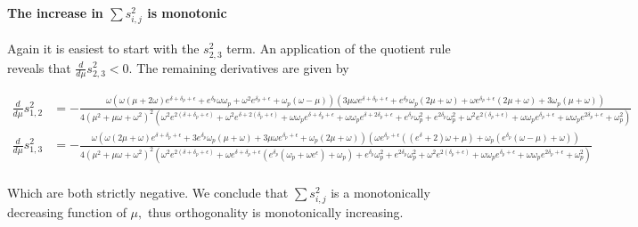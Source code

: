 \paragraph{The increase in $\sum{s^2_{i,j}}$ is monotonic}
Again it is easiest to start with the $s^2_{2,3}$ term.  An application of the quotient rule reveals that $\frac{d}{d\mu}s^2_{2,3}<0.$  
The remaining derivatives are given by
\begin{widetext}
\begin{eqnarray*}
\frac{d}{d\mu}s^2_{1,2}&=-\frac{\omega  \left(\omega  (\mu +2 \omega ) e^{\delta +\delta_p+\epsilon }+e^{\delta_p} \omega  \omega_p+\omega ^2 e^{\delta_p+\epsilon }+\omega_p (\omega -\mu )\right) \left(3 \mu  \omega  e^{\delta +\delta_p+\epsilon }+e^{\delta_p} \omega_p (2 \mu +\omega )+\omega  e^{\delta_p+\epsilon } (2 \mu +\omega )+3 \omega_p (\mu +\omega )\right)}{4 \left(\mu ^2+\mu  \omega +\omega ^2\right)^2 \left(\omega ^2 e^{2 (\delta +\delta_p+\epsilon )}+\omega ^2 e^{\delta +2 (\delta_p+\epsilon )}+\omega  \omega_p e^{\delta +\delta_p+\epsilon }+\omega  \omega_p e^{\delta +2 \delta_p+\epsilon }+e^{\delta_p} \omega_p^2+e^{2 \delta_p} \omega_p^2+\omega ^2 e^{2 (\delta_p+\epsilon )}+\omega  \omega_p e^{\delta_p+\epsilon }+\omega  \omega_p e^{2 \delta_p+\epsilon }+\omega_p^2\right)}\\
\frac{d}{d\mu}s^2_{1,3}&=-\frac{\omega  \left(\omega  (2 \mu +\omega ) e^{\delta +\delta_p+\epsilon }+3 e^{\delta_p} \omega_p (\mu +\omega )+3 \mu  \omega  e^{\delta_p+\epsilon }+\omega_p (2 \mu +\omega )\right) \left(\omega  e^{\delta_p+\epsilon } \left(\left(e^{\delta }+2\right) \omega +\mu \right)+\omega_p \left(e^{\delta_p} (\omega -\mu )+\omega \right)\right)}{4 \left(\mu ^2+\mu  \omega +\omega ^2\right)^2 \left(\omega ^2 e^{2 (\delta +\delta_p+\epsilon )}+\omega  e^{\delta +\delta_p+\epsilon } \left(e^{\delta_p} \left(\omega_p+\omega  e^{\epsilon }\right)+\omega_p\right)+e^{\delta_p} \omega_p^2+e^{2 \delta_p} \omega_p^2+\omega ^2 e^{2 (\delta_p+\epsilon )}+\omega  \omega_p e^{\delta_p+\epsilon }+\omega  \omega_p e^{2 \delta_p+\epsilon }+\omega_p^2\right)}\\
\end{eqnarray*}
\end{widetext}
Which are both strictly negative.  We conclude that $\sum{s^2_{i,j}}$ is a monotonically decreasing function of $\mu,$ thus orthogonality is monotonically increasing.





